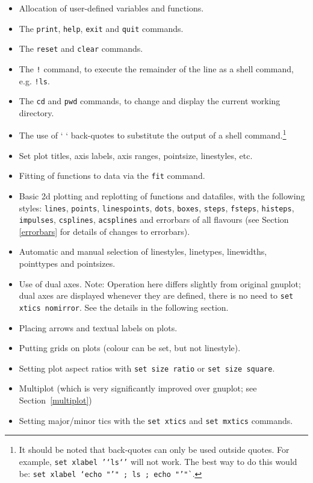 \documentclass[a4paper,onecolumn,11pt]{book}
\begin{document}
\begin{itemize}
\item Allocation of user-defined variables and functions.
\item The \texttt{print}, \texttt{help}, \texttt{exit} and \texttt{quit} commands.
\item The \texttt{reset} and \texttt{clear} commands.
\item The \texttt{!} command, to execute the remainder of the line as a shell command, e.g. \texttt{!ls}.
\item The \texttt{cd} and \texttt{pwd} commands, to change and display the current working directory.
\item The use of ` ` back-quotes to substitute the output of a shell command.\footnote{It should be noted that back-quotes can only be used outside quotes. For example, \texttt{set xlabel '`ls`'} will not work. The best way to do this would be: \texttt{set xlabel `echo "'" ; ls ; echo "'"`}.}
\item Set plot titles, axis labels, axis ranges, pointsize, linestyles, etc.
\item Fitting of functions to data via the \texttt{fit} command.
\item Basic 2d plotting and replotting of functions and datafiles, with the following styles: \texttt{lines}, \texttt{points}, \texttt{linespoints}, \texttt{dots}, \texttt{boxes}, \texttt{steps}, \texttt{fsteps}, \texttt{histeps}, \texttt{impulses}, \texttt{csplines}, \texttt{acsplines} and errorbars of all flavours (see Section \ref{errorbars} for details of changes to errorbars).
\item Automatic and manual selection of linestyles, linetypes, linewidths, pointtypes and pointsizes.
\item Use of dual axes. Note: Operation here differs slightly from original gnuplot; dual axes are displayed whenever they are defined, there is no need to \texttt{set xtics nomirror}. See the details in the following section.
\item Placing arrows and textual labels on plots.
\item Putting grids on plots (colour can be set, but not linestyle).
\item Setting plot aspect ratios with \texttt{set size ratio} or \texttt{set size square}.
\item Multiplot (which is very significantly improved over gnuplot; see Section~\ref{multiplot})
\item Setting major/minor tics with the \texttt{set xtics} and \texttt{set mxtics} commands.
\end{itemize}
\end{document}

